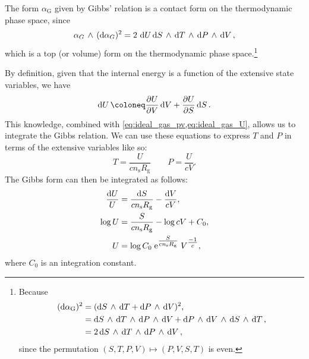 The form $\alpha_\text{G}$ given by Gibbs' relation is a contact form on the thermodynamic phase space, since
$$  \alpha_G\,\wedge\,(\dd{\alpha_G})^2  = 2\,\dd{U}  \dd{S}\,\wedge\,\dd{T} \,\wedge\, \dd{P}\,\wedge\,\dd{V}  , $$
which is a top (or volume) form on the thermodynamic phase space.\footnote
{
    Because 
    \begin{equation*} 
        \begin{split}
            (\dd{\alpha_\text{G}})^2 &= ( \dd{S}\,\wedge\,\dd{T}  +  \dd{P}\,\wedge\,\dd{V} )^2, \\
                            &=   \dd{S}\,\wedge\,\dd{T} \,\wedge\, \dd{P}\,\wedge\,\dd{V}   +   \dd{P}\,\wedge\,\dd{V} \,\wedge\, \dd{S}\,\wedge\,\dd{T}  , \\
                            &= 2  \dd{S}\,\wedge\,\dd{T} \,\wedge\, \dd{P}\,\wedge\,\dd{V}  , \\
        \end{split}
    \end{equation*}
    since the permutation $ (S, T, P, V) \mapsto (P, V, S, T) $ is even.
}


By definition, given that the internal energy is a function of the extensive state variables, we have
$$ \dd{U} \coloneq \pdv{U}{V}\dd{V} + \pdv{U}{S}\dd{S}.$$
This knowledge, combined with \cref{eq:ideal_gas_pv,eq:ideal_gas_U}, allows us to integrate the Gibbs relation. We can use these equations to express $T$ and $P$ in terms of the extensive variables like so:
$$ T = \frac{U}{cn_\text{s}R_\text{g}} \qquad P = \frac{U}{cV}. $$
The Gibbs form can then be integrated as follows:
\begin{equation*}
    \begin{split}
        \frac{\dd{U}}{U} &= \frac{\dd{S}}{cn_\text{s}R_\text{g}} - \frac{\dd{V}}{c V},\\
        \log{U}  &= \frac{S}{ cn_\text{s}R_\text{g}} - \log{c V} + C_0, \\
        U  &= \log{C_0} \; \mathrm{e}^{\tfrac{S}{ cn_\text{s}R_\text{g}}} \; V^{\tfrac{-1}{c}},\\
    \end{split}
\end{equation*}
where $C_0$ is an integration constant.

